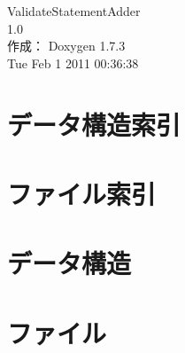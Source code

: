 \documentclass[a4paper]{book}
\begin{document}
\begin{titlepage}
\vspace*{7cm}
\begin{center}
{\Large ValidateStatementAdder \\[1ex]\large 1.0 }\\
\vspace*{1cm}
{\large 作成： Doxygen 1.7.3}\\
\vspace*{0.5cm}
{\small Tue Feb 1 2011 00:36:38}\\
\end{center}
\end{titlepage}
\clearemptydoublepage
{}
\tableofcontents
\clearemptydoublepage
{}
\chapter{データ構造索引}

\chapter{ファイル索引}

\chapter{データ構造}















\chapter{ファイル}


































\printindex
\end{document}
